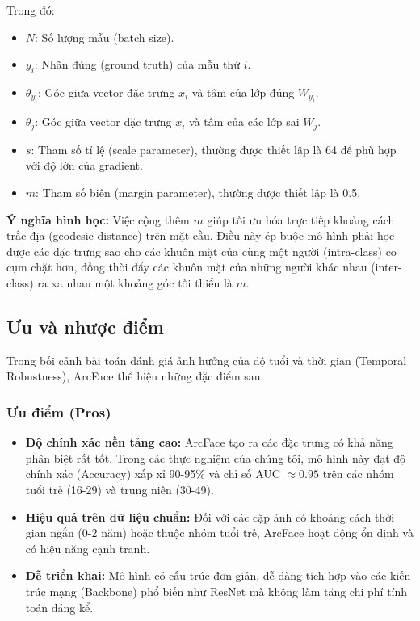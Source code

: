 Trong đó:
\begin{itemize}
    \item $N$: Số lượng mẫu (batch size).
    \item $y_i$: Nhãn đúng (ground truth) của mẫu thứ $i$.
    \item $\theta_{y_i}$: Góc giữa vector đặc trưng $x_i$ và tâm của lớp đúng $W_{y_i}$.
    \item $\theta_j$: Góc giữa vector đặc trưng $x_i$ và tâm của các lớp sai $W_j$.
    \item $s$: Tham số tỉ lệ (scale parameter), thường được thiết lập là 64 để phù hợp với độ lớn của gradient.
    \item $m$: Tham số biên (margin parameter), thường được thiết lập là 0.5.
\end{itemize}

\textbf{Ý nghĩa hình học:} Việc cộng thêm $m$ giúp tối ưu hóa trực tiếp khoảng cách trắc địa (geodesic distance) trên mặt cầu. Điều này ép buộc mô hình phải học được các đặc trưng sao cho các khuôn mặt của cùng một người (intra-class) co cụm chặt hơn, đồng thời đẩy các khuôn mặt của những người khác nhau (inter-class) ra xa nhau một khoảng góc tối thiểu là $m$.

\subsection{Ưu và nhược điểm}
Trong bối cảnh bài toán đánh giá ảnh hưởng của độ tuổi và thời gian (Temporal Robustness), ArcFace thể hiện những đặc điểm sau:

\subsubsection{Ưu điểm (Pros)}
\begin{itemize}
    \item \textbf{Độ chính xác nền tảng cao:} ArcFace tạo ra các đặc trưng có khả năng phân biệt rất tốt. Trong các thực nghiệm của chúng tôi, mô hình này đạt độ chính xác (Accuracy) xấp xỉ 90-95\% và chỉ số AUC $\approx 0.95$ trên các nhóm tuổi trẻ (16-29) và trung niên (30-49).
    \item \textbf{Hiệu quả trên dữ liệu chuẩn:} Đối với các cặp ảnh có khoảng cách thời gian ngắn (0-2 năm) hoặc thuộc nhóm tuổi trẻ, ArcFace hoạt động ổn định và có hiệu năng cạnh tranh.
    \item \textbf{Dễ triển khai:} Mô hình có cấu trúc đơn giản, dễ dàng tích hợp vào các kiến trúc mạng (Backbone) phổ biến như ResNet mà không làm tăng chi phí tính toán đáng kể.
\end{itemize}

